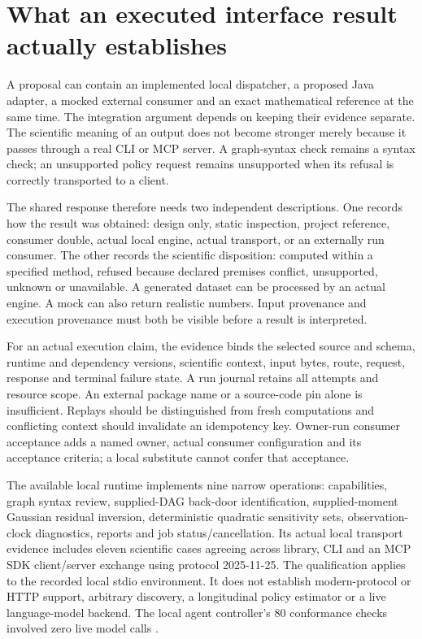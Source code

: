 \section{What an executed interface result actually establishes}
\label{exec14:execution-meaning}

A proposal can contain an implemented local dispatcher, a proposed Java adapter,
a mocked external consumer and an exact mathematical reference at the same time.
The integration argument depends on keeping their evidence separate. The
scientific meaning of an output does not become stronger merely because it
passes through a real CLI or MCP server. A graph-syntax check remains a syntax
check; an unsupported policy request remains unsupported when its refusal is
correctly transported to a client.

The shared response therefore needs two independent descriptions. One records
how the result was obtained: design only, static inspection, project reference,
consumer double, actual local engine, actual transport, or an externally run
consumer. The other records the scientific disposition: computed within a
specified method, refused because declared premises conflict, unsupported,
unknown or unavailable. A generated dataset can be processed by an actual
engine. A mock can also return realistic numbers. Input provenance and execution
provenance must both be visible before a result is interpreted.

For an actual execution claim, the evidence binds the selected source and
schema, runtime and dependency versions, scientific context, input bytes,
route, request, response and terminal failure state. A run journal retains all
attempts and resource scope. An external package name or a source-code pin alone
is insufficient. Replays should be distinguished from fresh computations and
conflicting context should invalidate an idempotency key. Owner-run consumer
acceptance adds a named owner, actual consumer configuration and its acceptance
criteria; a local substitute cannot confer that acceptance.

The available local runtime implements nine narrow operations: capabilities,
graph syntax review, supplied-DAG back-door identification, supplied-moment
Gaussian residual inversion, deterministic quadratic sensitivity sets,
observation-clock diagnostics, reports and job status/cancellation. Its actual
local transport evidence includes eleven scientific cases agreeing across
library, CLI and an MCP SDK client/server exchange using protocol 2025-11-25.
The qualification applies to the recorded local stdio environment. It does not
establish modern-protocol or HTTP support, arbitrary discovery, a longitudinal
policy estimator or a live language-model backend. The local agent controller's
80 conformance checks involved zero live model calls
\citep{exec14_execution_evidence}.

